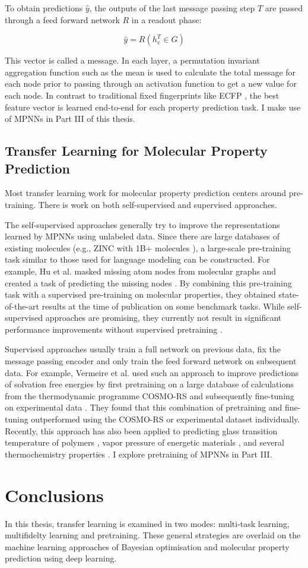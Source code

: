 To obtain predictions $\hat y$, the outputs of the last message passing step $T$ are passed through a feed forward network $R$ in a readout phase:

\begin{equation}
    \hat y = R(h_v^T \in G)
\end{equation}

This  vector is called a message. In each layer, a permutation invariant aggregation function such as the mean is used to calculate the total message for each node prior to passing through an activation function to get a new value for each node.  In contrast to traditional fixed fingerprints like ECFP \cite{Rogers2010}, the best feature vector is learned end-to-end for each property prediction task. I make use of MPNNs in Part III of this thesis.

\subsection{Transfer Learning for Molecular Property Prediction}

Most transfer learning work for molecular property prediction centers around pre-training. There is work on both self-supervised and supervised approaches.

The self-supervised approaches generally try to improve the representations learned by MPNNs using unlabeled data. Since there are large databases of existing molecules (e.g., ZINC with 1B+ molecules \cite{Irwin2020}), a large-scale pre-training task similar to those used for language modeling can be constructed. For example, Hu et al. masked missing atom nodes from molecular graphs and created a task of predicting the missing nodes \cite{Hu2020Pretrain}. By combining this pre-training task with a supervised pre-training on molecular properties, they obtained state-of-the-art results at the time of publication on some benchmark tasks. While self-supervised approaches are promising, they currently not result in significant performance improvements without supervised pretraining \cite{Sun2022}.

Supervised approaches usually train a full network on previous data, fix the message passing encoder and only train the feed forward network on subsequent data. For example, Vermeire et al. used such an approach to improve predictions of solvation free energies by first pretraining on a large database of calculations from the thermodynamic programme COSMO-RS and subsequently fine-tuning on experimental data \cite{Vermeire2021, Vermeire2022}. They found that this combination of pretraining and fine-tuning outperformed using the COSMO-RS or experimental dataset individually. Recently, this approach has also been applied to predicting glass transition temperature of polymers \cite{Volgin2022}, vapor pressure of energetic materials \cite{Lansford2023}, and several thermochemistry properties \cite{Ureel2023}. I explore pretraining of MPNNs in Part III.

\section{Conclusions}

In this thesis, transfer learning is examined in two modes: multi-task learning, multifidelty learning and pretraining. These general strategies are overlaid on the machine learning approaches of Bayesian optimisation and molecular property prediction using deep learning. 